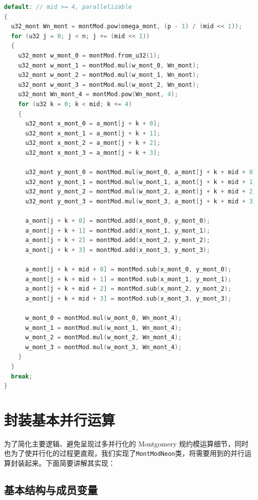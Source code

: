 \documentclass[a4paper]{article}
\begin{document}
\begin{lstlisting}[language=C++]
default: // mid >= 4, parallelizable
{
  u32_mont Wn_mont = montMod.pow(omega_mont, (p - 1) / (mid << 1));
  for (u32 j = 0; j < n; j += (mid << 1))
  {
    u32_mont w_mont_0 = montMod.from_u32(1);
    u32_mont w_mont_1 = montMod.mul(w_mont_0, Wn_mont);
    u32_mont w_mont_2 = montMod.mul(w_mont_1, Wn_mont);
    u32_mont w_mont_3 = montMod.mul(w_mont_2, Wn_mont);
    u32_mont Wn_mont_4 = montMod.pow(Wn_mont, 4);
    for (u32 k = 0; k < mid; k += 4)
    {
      u32_mont x_mont_0 = a_mont[j + k + 0];
      u32_mont x_mont_1 = a_mont[j + k + 1];
      u32_mont x_mont_2 = a_mont[j + k + 2];
      u32_mont x_mont_3 = a_mont[j + k + 3];

      u32_mont y_mont_0 = montMod.mul(w_mont_0, a_mont[j + k + mid + 0]);
      u32_mont y_mont_1 = montMod.mul(w_mont_1, a_mont[j + k + mid + 1]);
      u32_mont y_mont_2 = montMod.mul(w_mont_2, a_mont[j + k + mid + 2]);
      u32_mont y_mont_3 = montMod.mul(w_mont_3, a_mont[j + k + mid + 3]);

      a_mont[j + k + 0] = montMod.add(x_mont_0, y_mont_0);
      a_mont[j + k + 1] = montMod.add(x_mont_1, y_mont_1);
      a_mont[j + k + 2] = montMod.add(x_mont_2, y_mont_2);
      a_mont[j + k + 3] = montMod.add(x_mont_3, y_mont_3);

      a_mont[j + k + mid + 0] = montMod.sub(x_mont_0, y_mont_0);
      a_mont[j + k + mid + 1] = montMod.sub(x_mont_1, y_mont_1);
      a_mont[j + k + mid + 2] = montMod.sub(x_mont_2, y_mont_2);
      a_mont[j + k + mid + 3] = montMod.sub(x_mont_3, y_mont_3);

      w_mont_0 = montMod.mul(w_mont_0, Wn_mont_4);
      w_mont_1 = montMod.mul(w_mont_1, Wn_mont_4);
      w_mont_2 = montMod.mul(w_mont_2, Wn_mont_4);
      w_mont_3 = montMod.mul(w_mont_3, Wn_mont_4);
    }
  }
  break;
}
\end{lstlisting}

\section{封装基本并行运算}\label{sec:parallel_ops}

为了简化主要逻辑、避免呈现过多并行化的 Montgomery 规约模运算细节，同时也为了使并行化的过程更直观，我们实现了\texttt{MontModNeon}类，将需要用到的并行运算封装起来。下面简要讲解其实现：

\subsection{基本结构与成员变量}
\end{document}

